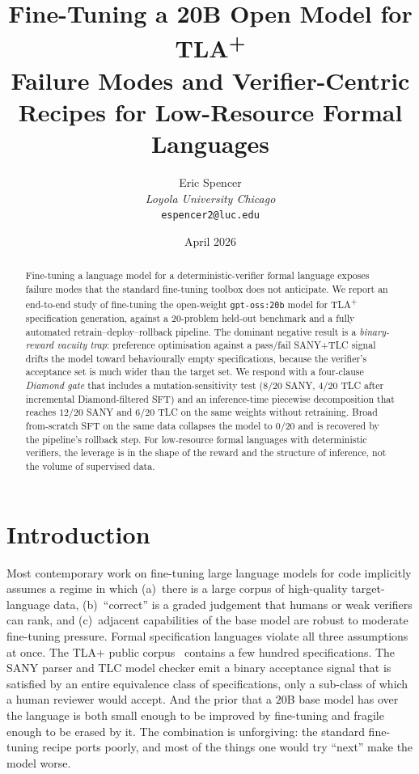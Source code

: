 \documentclass[11pt]{article}
\title{Fine-Tuning a 20B Open Model for TLA\textsuperscript{+}\\
\large Failure Modes and Verifier-Centric Recipes for Low-Resource Formal Languages}
\author{Eric Spencer\\
\small \textit{Loyola University Chicago}\\
\small \texttt{espencer2@luc.edu}}
\date{April 2026}
\begin{document}
\maketitle

\begin{abstract}
Fine-tuning a language model for a deterministic-verifier formal language
exposes failure modes that the standard fine-tuning toolbox does not
anticipate. We report an end-to-end study of fine-tuning the open-weight
\texttt{gpt-oss:20b} model for TLA\textsuperscript{+} specification
generation, against a $20$-problem held-out benchmark and a fully
automated retrain--deploy--rollback pipeline. The dominant negative
result is a \emph{binary-reward vacuity trap}: preference optimisation
against a pass/fail SANY+TLC signal drifts the model toward
behaviourally empty specifications, because the verifier's acceptance
set is much wider than the target set. We respond with a four-clause
\emph{Diamond gate} that includes a mutation-sensitivity test
($8/20$ SANY, $4/20$ TLC after incremental Diamond-filtered SFT) and an
inference-time piecewise decomposition that reaches $12/20$ SANY and
$6/20$ TLC on the same weights without retraining. Broad from-scratch
SFT on the same data collapses the model to $0/20$ and is recovered by
the pipeline's rollback step. For low-resource formal languages with
deterministic verifiers, the leverage is in the shape of the reward and
the structure of inference, not the volume of supervised data.
\end{abstract}

\section{Introduction}
\label{sec:intro}

Most contemporary work on fine-tuning large language models for code
implicitly assumes a regime in which (a)~there is a large corpus of
high-quality target-language data, (b)~``correct'' is a graded judgement
that humans or weak verifiers can rank, and (c)~adjacent capabilities of
the base model are robust to moderate fine-tuning pressure. Formal
specification languages violate all three assumptions at once. The TLA+
public corpus~\cite{lamport2002specifying} contains a few hundred
specifications. The SANY parser and TLC model checker emit a binary
acceptance signal that is satisfied by an entire equivalence class of
specifications, only a sub-class of which a human reviewer would accept.
And the prior that a $20$B base model has over the language is both small
enough to be improved by fine-tuning and fragile enough to be erased by
it. The combination is unforgiving: the standard fine-tuning recipe ports
poorly, and most of the things one would try ``next'' make the model
worse.
\end{document}
